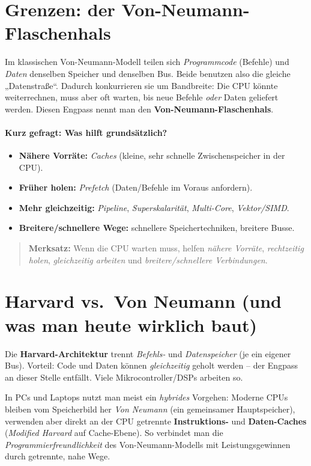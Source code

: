 \documentclass[../skript/main.tex]{subfiles}
\begin{document}
\section{Grenzen: der Von-Neumann-Flaschenhals}
Im klassischen Von-Neumann-Modell teilen sich \emph{Programmcode} (Befehle) und \emph{Daten}
denselben Speicher und denselben Bus. Beide benutzen also die gleiche „Datenstraße“.
Dadurch konkurrieren sie um Bandbreite: Die CPU könnte weiterrechnen, muss aber oft warten,
bis neue Befehle \emph{oder} Daten geliefert werden. Diesen Engpass nennt man den
\textbf{Von-Neumann-Flaschenhals}.

\paragraph{Kurz gefragt: Was hilft grundsätzlich?}
\begin{itemize}
	\item \textbf{Nähere Vorräte:} \emph{Caches} (kleine, sehr schnelle Zwischenspeicher in der CPU).
	\item \textbf{Früher holen:} \emph{Prefetch} (Daten/Befehle im Voraus anfordern).
	\item \textbf{Mehr gleichzeitig:} \emph{Pipeline}, \emph{Superskalarität}, \emph{Multi-Core}, \emph{Vektor/SIMD}.
	\item \textbf{Breitere/schnellere Wege:} schnellere Speichertechniken, breitere Busse.
\end{itemize}

\begin{quote}\small
	\textbf{Merksatz:} Wenn die CPU warten muss, helfen \emph{nähere Vorräte}, \emph{rechtzeitig holen},
	\emph{gleichzeitig arbeiten} und \emph{breitere/schnellere Verbindungen}.
\end{quote}

\section{Harvard vs.\ Von Neumann (und was man heute wirklich baut)}
Die \textbf{Harvard-Architektur} trennt \emph{Befehls-} und \emph{Datenspeicher} (je ein eigener Bus).
Vorteil: Code und Daten können \emph{gleichzeitig} geholt werden – der Engpass an dieser Stelle entfällt.
Viele Mikrocontroller/DSPs arbeiten so.

In PCs und Laptops nutzt man meist ein \emph{hybrides} Vorgehen:
Moderne CPUs bleiben vom Speicherbild her \emph{Von Neumann} (ein gemeinsamer Hauptspeicher),
verwenden aber direkt an der CPU getrennte \textbf{Instruktions-} und \textbf{Daten-Caches}
(\emph{Modified Harvard} auf Cache-Ebene). So verbindet man die
\emph{Programmierfreundlichkeit} des Von-Neumann-Modells mit Leistungsgewinnen durch getrennte, nahe Wege.
\end{document}
